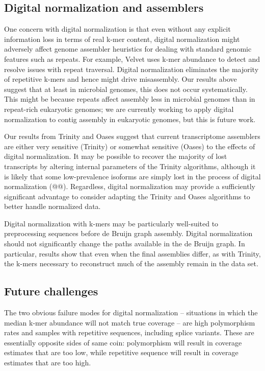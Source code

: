 \documentclass[10pt]{article}
\begin{document}
\subsection*{Digital normalization and assemblers}

One concern with digital normalization is that even without any
explicit information loss in terms of real k-mer content, digital
normalization might adversely affect genome assembler heuristics for
dealing with standard genomic features such as repeats.  For example,
Velvet uses k-mer abundance to detect and resolve issues with repeat
traversal.  Digital normalization eliminates the majority of
repetitive k-mers and hence might drive misassembly. Our results above
suggest that at least in microbial genomes, this does not occur
systematically.  This might be because repeats affect assembly less in
microbial genomes than in repeat-rich eukaryotic genomes; we are
currently working to apply digital normalization to contig assembly in
eukaryotic genomes, but this is future work.

Our results from Trinity and Oases suggest that current transcriptome
assemblers are either very sensitive (Trinity) or somewhat sensitive
(Oases) to the effects of digital normalization.  It may be possible
to recover the majority of lost transcripts by altering internal
parameters of the Trinity algorithms, although it is likely that some
low-prevalence isoforms are simply lost in the process of digital
normalization (@@).  Regardless, digital normalization may provide
a sufficiently significant advantage to consider adapting the Trinity
and Oases algorithms to better handle normalized data.

Digital normalization with k-mers may be particularly well-suited to
preprocessing sequences before de Bruijn graph assembly.  Digital
normalization should not significantly change the paths available in
the de Bruijn graph.  In particular, results show that even when the
final assemblies differ, as with Trinity, the k-mers necessary to
reconstruct much of the assembly remain in the data set.


\subsection*{Future challenges}

The two obvious failure modes for digital normalization -- situations
in which the median k-mer abundance will not match true coverage --
are high polymorphism rates and samples with repetitive sequences,
including splice variants.  These are essentially opposite sides of
same coin: polymorphism will result in coverage estimates that are too
low, while repetitive sequence will result in coverage estimates that
are too high.
\end{document}
